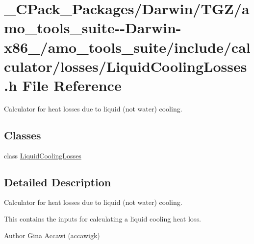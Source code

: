 \hypertarget{___c_pack___packages_2_darwin_2_t_g_z_2amo__tools__suite--_darwin-x86__64_2amo__tools__suite_2in2f26b30c7a12590cf79896a5deffdcab}{}\section{\+\_\+\+C\+Pack\+\_\+\+Packages/\+Darwin/\+T\+G\+Z/amo\+\_\+tools\+\_\+suite-\/-\/\+Darwin-\/x86\+\_/amo\+\_\+tools\+\_\+suite/include/calculator/losses/\+Liquid\+Cooling\+Losses.h File Reference}
\label{___c_pack___packages_2_darwin_2_t_g_z_2amo__tools__suite--_darwin-x86__64_2amo__tools__suite_2in2f26b30c7a12590cf79896a5deffdcab}


Calculator for heat losses due to liquid (not water) cooling.  


\subsection*{Classes}
\begin{DoxyCompactItemize}
\item 
class \hyperlink{class_liquid_cooling_losses}{Liquid\+Cooling\+Losses}
\end{DoxyCompactItemize}


\subsection{Detailed Description}
Calculator for heat losses due to liquid (not water) cooling. 

This contains the inputs for calculating a liquid cooling heat loss.

\begin{DoxyAuthor}{Author}
Gina Accawi (accawigk) 
\end{DoxyAuthor}
